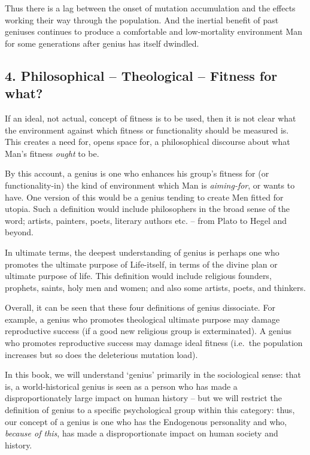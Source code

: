 \documentclass[
]{book}
\begin{document}
Thus there is a lag between the onset of mutation accumulation and the effects working their way through the population. And the inertial benefit of past geniuses continues to produce a comfortable and low-mortality environment Man for some generations after genius has itself dwindled.

\hypertarget{philosophical-theological-fitness-for-what}{%
\subsection*{4. Philosophical -- Theological -- Fitness for what?}\label{philosophical-theological-fitness-for-what}}

If an ideal, not actual, concept of fitness is to be used, then it is not clear what the environment against which fitness or functionality should be measured is. This creates a need for, opens space for, a philosophical discourse about what Man's fitness \emph{ought} to be.

By this account, a genius is one who enhances his group's fitness for (or functionality-in) the kind of environment which Man is \emph{aiming-for}, or wants to have. One version of this would be a genius tending to create Men fitted for utopia. Such a definition would include philosophers in the broad sense of the word; artists, painters, poets, literary authors etc. -- from Plato to Hegel and beyond.

In ultimate terms, the deepest understanding of genius is perhaps one who promotes the ultimate purpose of Life-itself, in terms of the divine plan or ultimate purpose of life. This definition would include religious founders, prophets, saints, holy men and women; and also some artists, poets, and thinkers.

Overall, it can be seen that these four definitions of genius dissociate. For example, a genius who promotes theological ultimate purpose may damage reproductive success (if a good new religious group is exterminated). A genius who promotes reproductive success may damage ideal fitness (i.e.~the population increases but so does the deleterious mutation load).

In this book, we will understand `genius' primarily in the sociological sense: that is, a world-historical genius is seen as a person who has made a disproportionately large impact on human history -- but we will restrict the definition of genius to a specific psychological group within this category: thus, our concept of a genius is one who has the Endogenous personality and who, \emph{because of this}, has made a disproportionate impact on human society and history.
\end{document}
